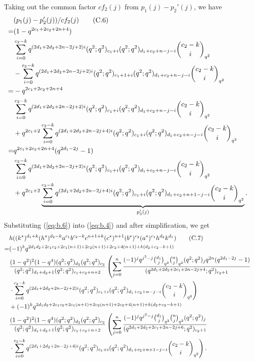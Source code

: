 \documentclass[table,a4paper,reqno]{amsart}
\numberwithin{equation}{section}
\theoremstyle{definition}
\begin{document}
Taking out the common factor $cf_2(j)$ from $p_1(j)-p_2'(j)$, we have
\begin{align}\label{eq:b.6}\stepcounter{equation}
        &(p_1(j)-p_2'(j))/cf_2(j)\tag{C.6}\\
        =&(1-q^{2c_1+2c_2+2n+4})\notag\\
        &\sum_{i=0}^{c_2-k}q^{(2d_1+2d_2+2n-2j+2)i}(q^2;q^2)_{c_1+i}(q^2;q^2)_{d_1+c_2+n-j-i}{c_2-k\choose i}_{q^2}\notag\\
        &-\sum_{i=0}^{c_2-k}q^{(2d_1+2d_2+2n-2j+2)i}(q^2;q^2)_{c_1+1+i}(q^2;q^2)_{d_1+c_2+n-j-i}{c_2-k\choose i}_{q^2}\notag\\
        =&-q^{2c_1+2c_2+2n+4}\notag\\
        &\sum_{i=0}^{c_2-k}q^{(2d_1+2d_2+2n-2j+2)i}(q^2;q^2)_{c_1+i}(q^2;q^2)_{d_1+c_2+n-j-i}{c_2-k\choose i}_{q^2}\notag\\
        &+q^{2c_1+2}\sum_{i=0}^{c_2-k}q^{(2d_1+2d_2+2n-2j+4)i}(q^2;q^2)_{c_1+i}(q^2;q^2)_{d_1+c_2+n-j-i}{c_2-k\choose i}_{q^2}\notag\\
        =&q^{2c_1+2c_2+2n+4}(q^{2d_1-2j}-1)\notag\\
        &\sum_{i=0}^{c_2-k}q^{(2d_1+2d_2+2n-2j+2)i}(q^2;q^2)_{c_1+i}(q^2;q^2)_{d_1+c_2+n-j-i}{c_2-k\choose i}_{q^2}\notag\\
        &+q^{2c_1+2}\underbrace{\sum_{i=0}^{c_2-k}q^{(2d_1+2d_2+2n-2j+4)i}(q^2;q^2)_{c_1+i}(q^2;q^2)_{d_1+c_2+n+1-j-i}{c_2-k\choose i}_{q^2}}_{p_3'(j)}.\notag
\end{align}
Substituting (\ref{eq:b.6}) into (\ref{eq:b.4}) and after simplification, we get
\begin{align}\label{eq:b.7}\stepcounter{equation}
        &h((k^*)^{d_1+k}(h^*)^{d_2-k}a^{c_1}b^{c_2-k}c^{n+1+k}(c^*)^{n+1}(b^*)^{c_2}(a^*)^{c_1}h^{d_2}k^{d_1})\tag{C.7}\\
        =&(-1)^kq^{2d_1d_2+2c_1c_2+2c_1(n+1)+2c_2(n+1)+2c_2+4(n+1)+k(d_2+c_2-k+1)}\notag\\
        &\frac{(1-q^2)^2(1-q^4)(q^2;q^2)_{d_2}(q^2;q^2)_{c_2}}{(q^2;q^2)_{d_1+d_2+1}(q^2;q^2)_{c_1+c_2+n+2}}\left(\sum_{j=0}^{n}\frac{(-1)^{j}q^{j^2-j}{d_1\choose j}_{q^{2}}{n\choose j}_{q^2}(q^2;q^2)_{j}q^{2n}(q^{2d_1-2j}-1)}{(q^{2d_1+2d_2+2c_1+2n-2j+4};q^2)_{c_2+1}}\right.\notag\\
        &\left.\cdot\sum_{i=0}^{c_2-k}q^{(2d_1+2d_2+2n-2j+2)i}(q^2;q^2)_{c_1+i}(q^2;q^2)_{d_1+c_2+n-j-i}{c_2-k\choose i}_{q^2}\right)\notag\\
        &+(-1)^kq^{2d_1d_2+2c_1c_2+2c_1(n+1)+2c_2(n+1)+2c_2+4(n+1)+k(d_2+c_2-k+1)}\notag\\
        &\frac{(1-q^2)^2(1-q^4)(q^2;q^2)_{d_2}(q^2;q^2)_{c_2}}{(q^2;q^2)_{d_1+d_2+1}(q^2;q^2)_{c_1+c_2+n+2}}\left(\sum_{j=0}^{n}\frac{(-1)^{j}q^{j^2-j}{d_1\choose j}_{q^{2}}{n\choose j}_{q^2}(q^2;q^2)_{j}}{(q^{2d_1+2d_2+2c_1+2n-2j+6};q^2)_{c_2+1}}\right.\notag\\
        &\left.\cdot\sum_{i=0}^{c_2-k}q^{(2d_1+2d_2+2n-2j+4)i}(q^2;q^2)_{c_1+i}(q^2;q^2)_{d_1+c_2+n+1-j-i}{c_2-k\choose i}_{q^2}\right).\notag
\end{align}
\end{document}
